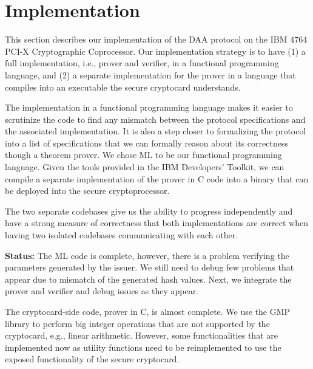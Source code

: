 \section{Implementation}

\begin{comment}
	\emph{EE:}
	We've two implementations.
	(implementation strategy) having two codebases using two different languages: - confidence that each implementation was correct - ability to work concurrently and with individual time constraints.
	cons: increased debuging time: Debug both in isolation, then debug their communication.
	We overshot (debugging in isolation is our current status). took much time to debug what was going wrong and we ended up with two buggy codebases. (The ML code is complete. The C code is incomplete. Both have bugs in isolation. We've yet to reach integration bugs.)
	
	!!!Things are broken!!!
\end{comment}
\fi

This section describes our implementation of the DAA protocol on the IBM 4764
PCI-X Cryptographic Coprocessor. Our implementation strategy is to have (1) a
full implementation, i.e., prover and verifier, in a functional programming
language, and (2) a separate implementation for the prover in a language that
compiles into an executable the secure cryptocard understands.

The implementation in a functional programming language makes it easier to
scrutinize the code to find any mismatch between the protocol specifications and
the associated implementation. It is also a step closer to formalizing the
protocol into a list of specifications that we can formally reason about its
correctness though a theorem prover. We chose ML to be our functional
programming language. Given the tools provided in the IBM Developers' Toolkit,
we can compile a separate implementation of the prover in C code into a binary
that can be deployed into the secure cryptoprocessor.

The two separate codebases give us the ability to progress independently and
have a strong measure of correctness that both implementations are correct when
having two isolated codebases communicating with each other.

{\bf Status:}
The ML code is complete, however, there is a problem verifying the parameters
generated by the issuer. We still need to debug few problems that appear due to
mismatch of the generated hash values. Next, we integrate the prover and
verifier and debug issues as they appear.

The cryptocard-side code, prover in C, is almost complete. We use the GMP
library to perform big integer operations that are not supported by the
cryptocard, e.g., linear arithmetic. However, some functionalities that are
implemented now as utility functions need to be reimplemented to use the exposed
functionality of the secure cryptocard.